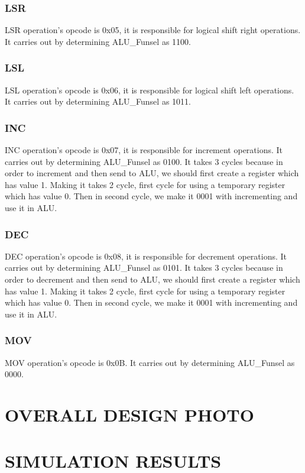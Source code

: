 \documentclass[pdftex,12pt,a4paper]{article}
\begin{document}
\subsubsection{LSR}
    LSR operation's opcode is 0x05, it is responsible for logical shift right operations. It carries out by determining ALU_Funsel as 1100.
\subsubsection{LSL}
    LSL operation's opcode is 0x06, it is responsible for logical shift left operations. It carries out by determining ALU_Funsel as 1011.
\subsubsection{INC}
    INC operation's opcode is 0x07, it is responsible for increment operations. It carries out by determining ALU_Funsel as 0100.
It takes 3 cycles because in order to increment and then send to ALU, we should first create a register
which has value 1. Making it takes 2 cycle, first cycle for using a temporary register which has value 0.
Then in second cycle, we make it 0001 with incrementing and use it in ALU.
\subsubsection{DEC}
    DEC operation's opcode is 0x08, it is responsible for decrement operations. It carries out by determining ALU_Funsel as 0101.
It takes 3 cycles because in order to decrement and then send to ALU, we should first create a register
which has value 1. Making it takes 2 cycle, first cycle for using a temporary register which has value 0.
Then in second cycle, we make it 0001 with incrementing and use it in ALU.
\subsubsection{MOV}
    MOV operation's opcode is 0x0B. It carries out by determining ALU_Funsel as 0000.


\section{OVERALL DESIGN PHOTO}








\section{SIMULATION RESULTS}
\end{document}
